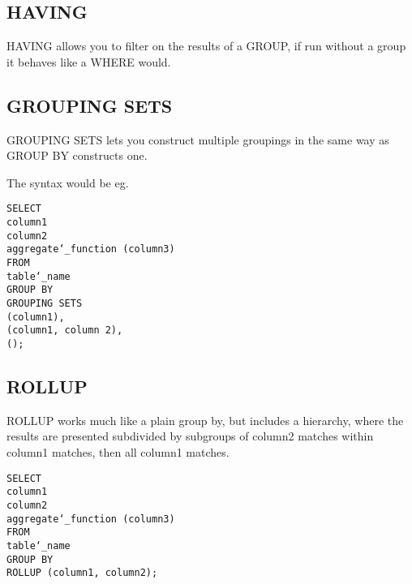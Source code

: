 \documentclass[10pt, english]{article}
\begin{document}
\subsection{HAVING}
HAVING allows you to filter on the results of a GROUP, if run without a group it behaves like a WHERE would.

\subsection{GROUPING SETS}
GROUPING SETS lets you construct multiple groupings in the same way as GROUP BY constructs one.

The syntax would be eg.

\texttt{SELECT\\
\hspace*{10pt} column1 \\
\hspace*{10pt} column2 \\
\hspace*{10pt} aggregate\char`_function (column3) \\
FROM \\
\hspace*{10pt} table\char`_name\\
GROUP BY \\
\hspace*{10pt} GROUPING SETS \\
\hspace*{10pt} \hspace*{10pt} (column1), \\
\hspace*{10pt} \hspace*{10pt} (column1, column 2), \\
\hspace*{10pt} \hspace*{10pt} ();
}

\subsection{ROLLUP}
ROLLUP works much like a plain group by, but includes a hierarchy, where the results are presented subdivided by subgroups of 
column2 matches within column1 matches, then all column1 matches.

\texttt{SELECT\\
\hspace*{10pt} column1 \\
\hspace*{10pt} column2 \\
\hspace*{10pt} aggregate\char`_function (column3) \\
FROM \\
\hspace*{10pt} table\char`_name\\
GROUP BY\\
\hspace*{10pt} ROLLUP (column1, column2);
}
\end{document}
